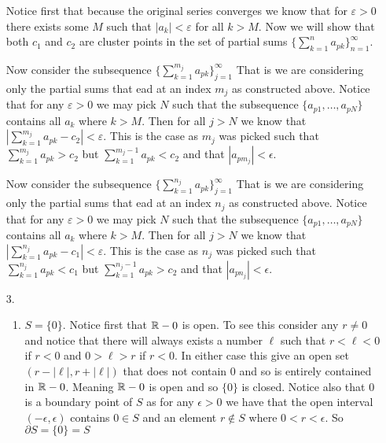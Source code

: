 \documentclass[12pt]{amsart}
\begin{document}
\begin{itemize}
        Notice first that because the original series converges we know that for
        $\varepsilon>0$ there exists some $M$ such that $|a_k|<\varepsilon$ for all
        $k>M$. Now we will show that both $c_1$ and $c_2$ are cluster points in the set
        of partial sums $\{\sum_{k=1}^{n}{a_{pk}}\}_{n=1}^{\infty}$.

        Now consider the subsequence $\{\sum_{k=1}^{m_j}{a_{pk}}\}_{j=1}^{\infty}$ That
        is we are considering only the partial sums that ead at an index $m_j$ as
        constructed above. Notice that for any $\varepsilon>0$ we may pick $N$ such
        that the subsequence $\{a_{p1},\dots,a_{pN}\}$ contains all $a_k$ where $k>M$.
        Then for all $j>N$ we know that $|\sum_{k=1}^{m_j}{a_{pk}}-c_2|<\varepsilon$.
        This is the case as $m_j$ was picked such that $\sum_{k=1}^{m_j}{a_{pk}}>c_2$
        but $\sum_{k=1}^{m_j-1}{a_{pk}}<c_2$ and that $|a_{p{m_j}}|<\epsilon$.

        Now consider the subsequence $\{\sum_{k=1}^{n_j}{a_{pk}}\}_{j=1}^{\infty}$ That
        is we are considering only the partial sums that ead at an index $n_j$ as
        constructed above. Notice that for any $\varepsilon>0$ we may pick $N$ such
        that the subsequence $\{a_{p1},\dots,a_{pN}\}$ contains all $a_k$ where $k>M$.
        Then for all $j>N$ we know that $|\sum_{k=1}^{n_j}{a_{pk}}-c_1|<\varepsilon$.
        This is the case as $n_j$ was picked such that $\sum_{k=1}^{n_j}{a_{pk}}<c_1$
        but $\sum_{k=1}^{n_j-1}{a_{pk}}>c_2$ and that $|a_{p{n_j}}|<\epsilon$.

    \item[3.] \begin{enumerate}
            \item $S=\{0\}$. Notice first that $\mathbb{R}-0$ is open. To see this consider any $r\neq 0$ and notice that
                  there will always exists a number $\ell$ such that $r<\ell< 0$ if $r<0$ and $0>\ell>r$ if $r<0$.
                  In either case this give an open set
                  $(r-|\ell|, r+|\ell|)$ that does not contain $0$ and so is entirely
                  contained in $\mathbb{R}-0$. Meaning $\mathbb{R}-0$ is open and so $\{0\}$ is closed.
                  Notice also that $0$ is a boundary point of $S$ as for any $\epsilon>0$ we have that the open interval
                  $(-\epsilon,\epsilon)$ contains $0\in S$ and an element $r\not\in S$ where $0<r<\epsilon$.
                  So $\partial S =\{0\}=S$


\end{enumerate}
\end{itemize}
\end{document}
